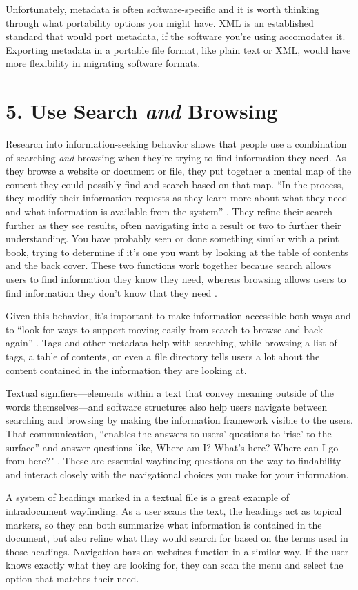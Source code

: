 \documentclass[10pt,letterpaper]{article}
\newcommand{\rulemajor}[1]{\section*{#1}}
\begin{document}
Unfortunately, metadata is often software-specific and it is worth
thinking through what portability options you might have.
XML is an established standard that would port metadata, if the software
you're using accomodates it. Exporting metadata in a portable file
format, like plain text or XML, would have more flexibility in migrating
software formats.

\rulemajor{5. Use Search \emph{and} Browsing}

Research into information-seeking behavior shows that people use a
combination of searching \emph{and} browsing when they're trying to find
information they need. As they browse a website or document or
file, they put together a mental map of the content they could possibly
find and search based on that map. ``In the process, they modify their
information requests as they learn more about what they need and what
information is available from the system'' \cite{Rosenfeld2015}. They refine their
search further as they see results, often navigating into a result or
two to further their understanding. You have probably seen or done
something similar with a print book, trying to determine if it's one you
want by looking at the table of contents and the back cover. These two
functions work together because search allows users to find information
they know they need, whereas browsing allows users to find information
they don't know that they need \cite{Bates2002}.

Given this behavior, it's important to make information accessible both
ways and to ``look for ways to support moving easily from search to
browse and back again'' \cite{Rosenfeld2015}. Tags and other metadata help with
searching, while browsing a list of tags, a table of contents, or even a
file directory tells users a lot about the content contained in the
information they are looking at.

Textual signifiers---elements within a text that convey meaning outside
of the words themselves---and software structures also help users
navigate between searching and browsing by making the information
framework visible to the users. That communication, ``enables the
answers to users' questions to `rise' to the surface'' and answer
questions like, Where am I? What's here? Where can I go from here?"
\cite{Rosenfeld2015}. These are essential wayfinding questions on the way to
findability and interact closely with the navigational choices you make
for your information.

A system of headings marked in a textual file is a great example of
intradocument wayfinding.
As a user scans the text, the headings act as topical markers, so they
can both summarize what information is contained in the document, but
also refine what they would search for based on the terms used in those
headings. Navigation bars on websites function in a similar way.
If the user knows exactly what they are looking for, they can scan the
menu and select the option that matches their need.
\end{document}
